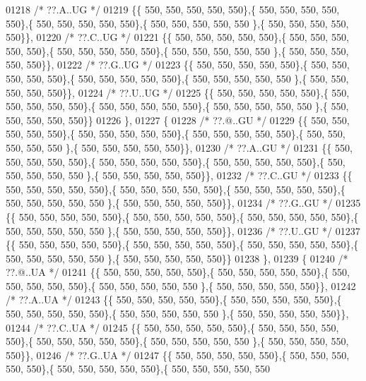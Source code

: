 \begin{DoxyCode}
01218 \textcolor{comment}{/* ??.A..UG */}
01219 \{\{ 550, 550, 550, 550, 550\},\{ 550, 550, 550, 550, 550\},\{ 550, 550, 550, 550, 550\},\{ 550, 550, 550, 550, 550
      \},\{ 550, 550, 550, 550, 550\}\},
01220 \textcolor{comment}{/* ??.C..UG */}
01221 \{\{ 550, 550, 550, 550, 550\},\{ 550, 550, 550, 550, 550\},\{ 550, 550, 550, 550, 550\},\{ 550, 550, 550, 550, 550
      \},\{ 550, 550, 550, 550, 550\}\},
01222 \textcolor{comment}{/* ??.G..UG */}
01223 \{\{ 550, 550, 550, 550, 550\},\{ 550, 550, 550, 550, 550\},\{ 550, 550, 550, 550, 550\},\{ 550, 550, 550, 550, 550
      \},\{ 550, 550, 550, 550, 550\}\},
01224 \textcolor{comment}{/* ??.U..UG */}
01225 \{\{ 550, 550, 550, 550, 550\},\{ 550, 550, 550, 550, 550\},\{ 550, 550, 550, 550, 550\},\{ 550, 550, 550, 550, 550
      \},\{ 550, 550, 550, 550, 550\}\}
01226 \},
01227 \{
01228 \textcolor{comment}{/* ??.@..GU */}
01229 \{\{ 550, 550, 550, 550, 550\},\{ 550, 550, 550, 550, 550\},\{ 550, 550, 550, 550, 550\},\{ 550, 550, 550, 550, 550
      \},\{ 550, 550, 550, 550, 550\}\},
01230 \textcolor{comment}{/* ??.A..GU */}
01231 \{\{ 550, 550, 550, 550, 550\},\{ 550, 550, 550, 550, 550\},\{ 550, 550, 550, 550, 550\},\{ 550, 550, 550, 550, 550
      \},\{ 550, 550, 550, 550, 550\}\},
01232 \textcolor{comment}{/* ??.C..GU */}
01233 \{\{ 550, 550, 550, 550, 550\},\{ 550, 550, 550, 550, 550\},\{ 550, 550, 550, 550, 550\},\{ 550, 550, 550, 550, 550
      \},\{ 550, 550, 550, 550, 550\}\},
01234 \textcolor{comment}{/* ??.G..GU */}
01235 \{\{ 550, 550, 550, 550, 550\},\{ 550, 550, 550, 550, 550\},\{ 550, 550, 550, 550, 550\},\{ 550, 550, 550, 550, 550
      \},\{ 550, 550, 550, 550, 550\}\},
01236 \textcolor{comment}{/* ??.U..GU */}
01237 \{\{ 550, 550, 550, 550, 550\},\{ 550, 550, 550, 550, 550\},\{ 550, 550, 550, 550, 550\},\{ 550, 550, 550, 550, 550
      \},\{ 550, 550, 550, 550, 550\}\}
01238 \},
01239 \{
01240 \textcolor{comment}{/* ??.@..UA */}
01241 \{\{ 550, 550, 550, 550, 550\},\{ 550, 550, 550, 550, 550\},\{ 550, 550, 550, 550, 550\},\{ 550, 550, 550, 550, 550
      \},\{ 550, 550, 550, 550, 550\}\},
01242 \textcolor{comment}{/* ??.A..UA */}
01243 \{\{ 550, 550, 550, 550, 550\},\{ 550, 550, 550, 550, 550\},\{ 550, 550, 550, 550, 550\},\{ 550, 550, 550, 550, 550
      \},\{ 550, 550, 550, 550, 550\}\},
01244 \textcolor{comment}{/* ??.C..UA */}
01245 \{\{ 550, 550, 550, 550, 550\},\{ 550, 550, 550, 550, 550\},\{ 550, 550, 550, 550, 550\},\{ 550, 550, 550, 550, 550
      \},\{ 550, 550, 550, 550, 550\}\},
01246 \textcolor{comment}{/* ??.G..UA */}
01247 \{\{ 550, 550, 550, 550, 550\},\{ 550, 550, 550, 550, 550\},\{ 550, 550, 550, 550, 550\},\{ 550, 550, 550, 550, 550

\end{DoxyCode}
